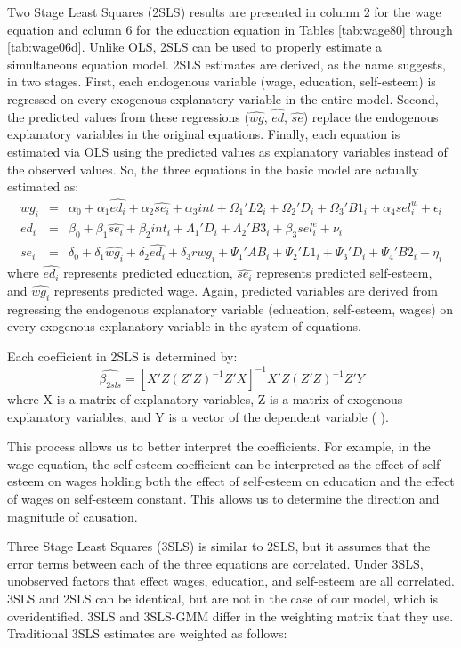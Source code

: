 \documentclass[12pt]{report}
\newcommand{\beq}{\begin{equation}}
\newcommand{\eeq}{\end{equation}}
\newcommand{\citee}[1]{\citename{#1} \citeyear{#1}}
\begin{document}
Two Stage Least Squares (2SLS) results are presented in column 2 for the wage equation and column 6 for the education equation in Tables \ref{tab:wage80} through \ref{tab:wage06d}. Unlike OLS, 2SLS can be used to properly estimate a simultaneous equation model. 2SLS estimates are derived, as the name suggests, in two stages. First, each endogenous variable (wage, education, self-esteem) is regressed on every exogenous explanatory variable in the entire model. Second, the predicted values from these regressions ($\hat{wg}$, $\hat{ed}$, $\hat{se}$) replace the endogenous explanatory variables in the original equations. Finally, each equation is estimated via OLS using the predicted values as explanatory variables instead of the observed values. So, the three equations in the basic model are actually estimated as:
\begin{eqnarray}
wg_i & = & \alpha_0 + \alpha_1 \hat{ed_i} + \alpha_2 \hat{se_i} + \alpha_3 int + \Omega_1' L2_i + \Omega_2' D_i + \Omega_3' B1_i + \alpha_4 sel_i^w + \epsilon_i \\
ed_i & = & \beta_0 + \beta_1 \hat{se_i} + \beta_2 int_i + \Lambda_1' D_i + \Lambda_2' B3_i + \beta_3 sel_i^e + \nu_i \\
se_i & = & \delta_0 + \delta_1 \hat{wg_i} + \delta_2 \hat{ed_i} + \delta_3 rwg_i  + \Psi_1' AB_i + \Psi_2' L1_i + \Psi_3' D_i + \Psi_4' B2_i + \eta_i
\end{eqnarray}
where $\hat{ed_i}$ represents predicted education, $\hat{se_i}$ represents predicted self-esteem, and $\hat{wg_i}$ represents predicted wage. Again, predicted variables are derived from regressing the endogenous explanatory variable (education, self-esteem, wages) on every exogenous explanatory variable in the system of equations.

Each coefficient in 2SLS is determined by:
\beq \hat{\beta_{2sls}} = [X' Z (Z' Z)^{-1} Z' X]^{-1} X' Z (Z' Z)^{-1}Z' Y\eeq
where X is a matrix of explanatory variables, Z is a matrix of exogenous explanatory variables, and Y is a vector of the dependent variable (\citee{W2002}).

This process allows us to better interpret the coefficients. For example, in the wage equation, the self-esteem coefficient can be interpreted as the effect of self-esteem on wages holding both the effect of self-esteem on education and the effect of wages on self-esteem constant. This allows us to determine the direction and magnitude of causation.

Three Stage Least Squares (3SLS) is similar to 2SLS, but it assumes that the error terms between each of the three equations are correlated. Under 3SLS, unobserved factors that effect wages, education, and self-esteem are all correlated. 3SLS and 2SLS can be identical, but are not in the case of our model, which is overidentified. 3SLS and 3SLS-GMM differ in the weighting matrix that they use. Traditional 3SLS estimates are weighted as follows:
\end{document}

